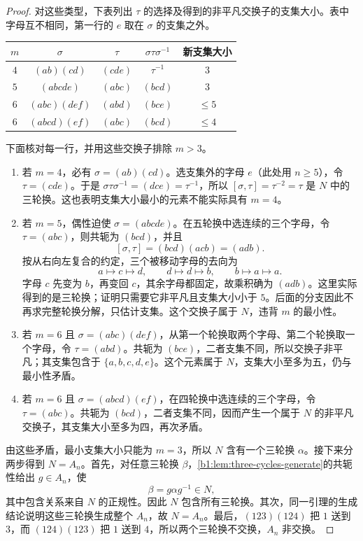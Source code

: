 \begin{proof}
	对这些类型，下表列出 \(\tau\) 的选择及得到的非平凡交换子的支集大小。表中字母互不相同，第一行的 \(e\) 取在 \(\sigma\) 的支集之外。
	\begin{center}
		\begin{tabular}{@{}ccccc@{}}
			\toprule
			\(m\) & \(\sigma\) & \(\tau\) & \(\sigma\tau\sigma^{-1}\) & 新支集大小\\
			\midrule
			\(4\) & \((ab)(cd)\) & \((cde)\) & \(\tau^{-1}\) & \(3\)\\
			\(5\) & \((abcde)\) & \((abc)\) & \((bcd)\) & \(3\)\\
			\(6\) & \((abc)(def)\) & \((abd)\) & \((bce)\) & \(\le5\)\\
			\(6\) & \((abcd)(ef)\) & \((abc)\) & \((bcd)\) & \(\le4\)\\
			\bottomrule
		\end{tabular}
	\end{center}
	下面核对每一行，并用这些交换子排除 \(m>3\)。
	\begin{enumerate}
		\item 若 \(m=4\)，必有 \(\sigma=(ab)(cd)\)。选支集外的字母 \(e\)（此处用 \(n\ge5\)），令 \(\tau=(cde)\)。于是 \(\sigma\tau\sigma^{-1}=(dce)=\tau^{-1}\)，所以 \([\sigma,\tau]=\tau^{-2}=\tau\) 是 \(N\) 中的三轮换。这也表明支集大小最小的元素不能实际具有 \(m=4\)。
		\item 若 \(m=5\)，偶性迫使 \(\sigma=(abcde)\)。在五轮换中选连续的三个字母，令 \(\tau=(abc)\)，则共轭为 \((bcd)\)，并且
			\[
				[\sigma,\tau]=(bcd)(acb)=(adb).
			\]
			按从右向左复合的约定，三个被移动字母的去向为
			\[
				a\mapsto c\mapsto d,\qquad d\mapsto d\mapsto b,\qquad b\mapsto a\mapsto a.
			\]
			字母 \(c\) 先变为 \(b\)，再变回 \(c\)，其余字母都固定，故乘积确为 \((adb)\)。这里实际得到的是三轮换；证明只需要它非平凡且支集大小小于 \(5\)。后面的分支因此不再求完整轮换分解，只估计支集。这个交换子属于 \(N\)，违背 \(m\) 的最小性。
		\item 若 \(m=6\) 且 \(\sigma=(abc)(def)\)，从第一个轮换取两个字母、第二个轮换取一个字母，令 \(\tau=(abd)\)。共轭为 \((bce)\)，二者支集不同，所以交换子非平凡；其支集包含于 \(\{a,b,c,d,e\}\)。这个元素属于 \(N\)，支集大小至多为五，仍与最小性矛盾。
		\item 若 \(m=6\) 且 \(\sigma=(abcd)(ef)\)，在四轮换中选连续的三个字母，令 \(\tau=(abc)\)。共轭为 \((bcd)\)，二者支集不同，因而产生一个属于 \(N\) 的非平凡交换子，其支集大小至多为四，再次矛盾。
	\end{enumerate}

	由这些矛盾，最小支集大小只能为 \(m=3\)，所以 \(N\) 含有一个三轮换 \(\alpha\)。接下来分两步得到 \(N=A_n\)。首先，对任意三轮换 \(\beta\)，\cref{b1:lem:three-cycles-generate}的共轭性给出 \(g\in A_n\)，使
	\[
		\beta=g\alpha g^{-1}\in N,
	\]
	其中包含关系来自 \(N\) 的正规性。因此 \(N\) 包含所有三轮换。其次，同一引理的生成结论说明这些三轮换生成整个 \(A_n\)，故 \(N=A_n\)。最后，\((123)(124)\) 把 \(1\) 送到 \(3\)，而 \((124)(123)\) 把 \(1\) 送到 \(4\)，所以两个三轮换不交换，\(A_n\) 非交换。
\end{proof}

